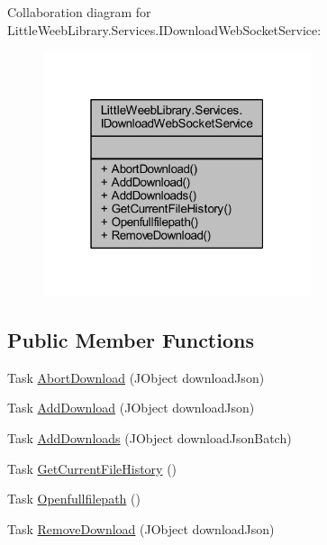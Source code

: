 Collaboration diagram for Little\+Weeb\+Library.\+Services.\+I\+Download\+Web\+Socket\+Service\+:\nopagebreak
\begin{figure}[H]
\begin{center}
\leavevmode
\includegraphics[width=223pt]{interface_little_weeb_library_1_1_services_1_1_i_download_web_socket_service__coll__graph}
\end{center}
\end{figure}
\subsection*{Public Member Functions}
\begin{DoxyCompactItemize}
\item 
Task \mbox{\hyperlink{interface_little_weeb_library_1_1_services_1_1_i_download_web_socket_service_a5f49ed53660e8c5253f0609e90fc839e}{Abort\+Download}} (J\+Object download\+Json)
\item 
Task \mbox{\hyperlink{interface_little_weeb_library_1_1_services_1_1_i_download_web_socket_service_ab33026e52e15229cd8fc79c7b37b76da}{Add\+Download}} (J\+Object download\+Json)
\item 
Task \mbox{\hyperlink{interface_little_weeb_library_1_1_services_1_1_i_download_web_socket_service_ad25da3bc121e428c5bcead6bd2feb8aa}{Add\+Downloads}} (J\+Object download\+Json\+Batch)
\item 
Task \mbox{\hyperlink{interface_little_weeb_library_1_1_services_1_1_i_download_web_socket_service_a2a3129b4bddba363d748c5608633c083}{Get\+Current\+File\+History}} ()
\item 
Task \mbox{\hyperlink{interface_little_weeb_library_1_1_services_1_1_i_download_web_socket_service_aa979c5549b6523e88fd8050a684ee493}{Openfullfilepath}} ()
\item 
Task \mbox{\hyperlink{interface_little_weeb_library_1_1_services_1_1_i_download_web_socket_service_a746432ed84ef331ea5851e645da54941}{Remove\+Download}} (J\+Object download\+Json)
\end{DoxyCompactItemize}


